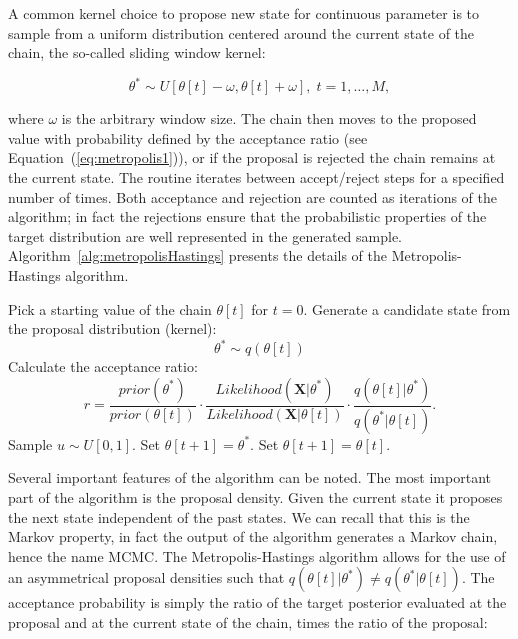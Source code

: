 A common kernel choice to propose new state for continuous parameter is to sample from a uniform distribution centered around the current state of the chain, the so-called sliding window kernel: 

$$\theta^{*}\sim U\left[\theta[t]-\omega,\theta[t]+\omega\right], \; t=1,\ldots,M,$$

\noindent
where $\omega$ is the arbitrary window size.
The chain then moves to the proposed value with probability defined by the acceptance ratio (see Equation~(\ref{eq:metropolis1})), or if the proposal is rejected the chain remains at the current state.
The routine iterates between accept/reject steps for a specified number of times.
Both acceptance and rejection are counted as iterations of the algorithm; in fact the rejections ensure that the probabilistic properties of the target distribution are well represented in the generated sample.  
Algorithm~\ref{alg:metropolisHastings} presents the details of the Metropolis-Hastings algorithm.

\begin{algorithm}[h!]
\centering
\begin{algorithmic}[1]
%
\State Pick a starting value of the chain $\theta \left[ t \right]$ for $t=0$.
%
%
\State Generate a candidate state from the proposal distribution (kernel):
$$\theta^{*} \sim q(\theta[t])$$
%
\State Calculate the acceptance ratio:
$$r=\frac{prior\left(\theta^{*}\right)}{prior\left(\theta\left[t\right]\right)}\cdot\frac{Likelihood\left(\mathbf{X}|\theta^{*}\right)}{Likelihood\left(\mathbf{X}|\theta\left[t\right]\right)}\cdot\frac{q\left(\theta\left[t\right]|\theta^{*}\right)}{q\left(\theta^{*}|\theta\left[t\right]\right)}.$$
%
\State Sample $u\sim U[0,1]$.
%
%
\State Set $\theta[t+1]=\theta^*.$
%
\Else 
%
\State Set $\theta[t+1]=\theta[t].$
%
\EndIf
%
\EndFor
\end{algorithmic}
\caption{
{ \footnotesize 
{\bf The Metropolis-Hastings algorithm} 
}%
}
\label{alg:metropolisHastings}
\end{algorithm}

Several important features of the algorithm can be noted.
The most important part of the algorithm is the proposal density. 
Given the current state it proposes the next state independent of the past states.
We can recall that this is the Markov property, in fact the output of the algorithm generates a Markov chain, hence the name MCMC.
The Metropolis-Hastings algorithm allows for the use of an asymmetrical proposal densities such that $q\left(\theta\left[t\right]|\theta^{*}\right)\neq q\left(\theta^{*}|\theta\left[t\right]\right)$.
The acceptance probability is simply the ratio of the target posterior evaluated at the proposal and at the current state of the chain, times the ratio of the proposal: 

